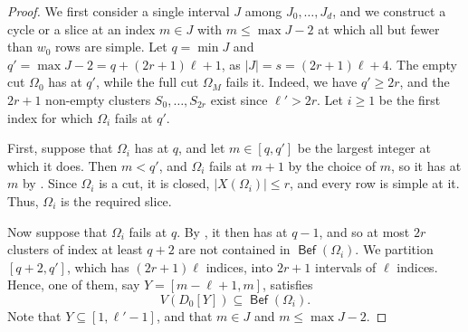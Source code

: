 \documentclass[fontsize=12pt,leading=14pt]{fullpaper}
\DeclareMathOperator{\Bef}{\mathsf{Bef}}
\begin{document}
\begin{proof}
  We first consider a single interval $J$ among $J_0,\dots,J_d$, and we construct a cycle or a slice at an index $m\in J$ with $m\le\max J-2$ at which all but fewer than $w_0$ rows are simple.
  Let $q=\min J$ and $q'=\max J-2=q+(2r+1)\ell+1$, as $|J|=s=(2r+1)\ell+4$.
  The empty cut $\Omega_0$ has  at $q'$, while the full cut $\Omega_M$ fails it.
  Indeed, we have $q'\ge2r$, and the $2r+1$ non-empty clusters $S_0,\dots,S_{2r}$ exist since $\ell'>2r$.
  Let $i\ge1$ be the first index for which $\Omega_i$ fails  at $q'$.

  First, suppose that $\Omega_i$ has  at $q$, and let $m\in[q,q']$ be the largest integer at which it does.
  Then $m<q'$, and $\Omega_i$ fails  at $m+1$ by the choice of $m$, so it has  at $m$ by .
  Since $\Omega_i$ is a cut, it is closed, $|X(\Omega_i)|\le r$, and every row is simple at it.
  Thus, $\Omega_i$ is the required slice.

  Now suppose that $\Omega_i$ fails  at $q$.
  By , it then has  at $q-1$, and so at most $2r$ clusters of index at least $q+2$ are not contained in $\Bef(\Omega_i)$.
  We partition $[q+2,q']$, which has $(2r+1)\ell$ indices, into $2r+1$ intervals of $\ell$ indices.
  Hence, one of them, say $Y=[m-\ell+1,m]$, satisfies
  \[
    V(D_0[Y])\subseteq\Bef(\Omega_i).
  \]
  Note that $Y\subseteq[1,\ell'-1]$, and that $m\in J$ and $m\le\max J-2$.


\end{proof}
\end{document}

